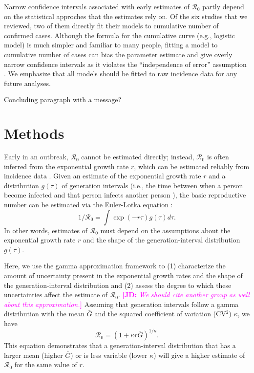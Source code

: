 \documentclass[12pt]{article}
\newcommand{\comment}[3]{\textcolor{#1}{\textbf{[#2: }\textsl{#3}\textbf{]}}}
\newcommand{\jd}[1]{\comment{magenta}{JD}{#1}}
\begin{document}
Narrow confidence intervals associated with early estimates of $\mathcal R_0$ partly depend on the statistical approches that the estimates rely on.
Of the six studies that we reviewed, two of them directly fit their models to cumulative number of confirmed cases.
Although the formula for the cumulative curve (e.g., logistic model) is much simpler and familiar to many people, 
fitting a model to cumulative number of cases can bias the parameter estimate and give overly narrow confidence intervals as it violates the ``independence of error'' assumption \citep{ma2014estimating, king2015avoidable}.
We emphasize that all models should be fitted to raw incidence data for any future analyses.



Concluding paragraph with a message?

\section{Methods}

Early in an outbreak, $\mathcal R_0$ cannot be estimated directly;
instead, $\mathcal R_0$ is often inferred from
the exponential growth rate $r$, which can be estimated reliably from incidence data \citep{mills2004transmissibility, nishiura2009transmission, ma2014estimating}. 
Given an estimate of the exponential growth rate $r$ and a distribution $g(\tau)$ of
generation intervals (i.e., the time between when a person become 
infected and that person infects another person \citep{svensson2007note}), the basic reproductive
number can be estimated via the Euler-Lotka equation \citep{wallinga2007generation}:
\begin{equation}
1/\mathcal R_0 = \int \exp(-r\tau) g(\tau) d\tau.
\end{equation}
In other words, estimates of $\mathcal R_0$ must
depend on the assumptions about the
exponential growth rate $r$ and the shape of the generation-interval distribution $g(\tau)$.

Here, we use the gamma approximation framework \citep{park2019practical} to (1) characterize the amount of uncertainty present in the exponential growth rates and the shape of the generation-interval distribution and (2) assess the degree to which these uncertainties affect the estimate of $\mathcal R_0$.
\jd{We should cite another group as well about this approximation.}
Assuming that generation intervals follow a gamma distribution
with the mean $\bar G$ and the squared coefficient of variation (CV$^2$) $\kappa$, 
we have
\begin{equation}
\mathcal R_0 = \left(1 + \kappa r \bar{G}\right)^{1/\kappa}.
\label{eq:gamma}
\end{equation}
This equation demonstrates that a generation-interval distribution
that has a larger mean (higher $\bar{G}$) or is less variable (lower $\kappa$)
will give a higher estimate of $\mathcal R_0$ for the same value of $r$.
\end{document}
